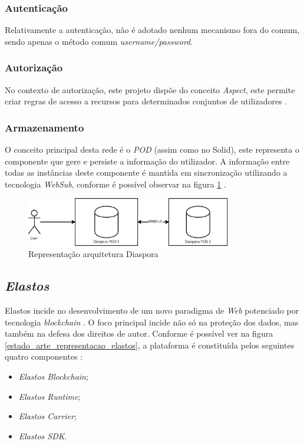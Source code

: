 \subsubsection{Autenticação}
Relativamente a autenticação, não é adotado nenhum mecanismo fora do comum, sendo apenas o método comum \emph{username/password}.

\subsubsection{Autorização}
No contexto de autorização, este projeto dispõe do conceito \emph{Aspect}, este permite criar regras de acesso a recursos para determinados conjuntos de utilizadores \cite{diaspora_wiki}.

\subsubsection{Armazenamento}
O conceito principal desta rede é o \emph{\acrshort{POD}} (assim como no Solid), este representa o componente que gere e persiste a informação do utilizador. A informação entre todas as instâncias deste componente é mantida em sincronização utilizando a tecnologia \emph{WebSub}, conforme é possível observar na figura \ref{estado_arte_representacao_diaspora} \cite{diaspora_wiki}.

\begin{figure}[H]
    \begin{center}
        \includegraphics[width=0.8\textwidth]{figures/estado_arte-Diaspora.eps}
        \caption{Representação arquitetura Diaspora}
        \label{estado_arte_representacao_diaspora}
    \end{center}
\end{figure}

\subsection{\emph{Elastos}}
Elastos incide no desenvolvimento de um novo paradigma de \emph{Web} potenciado por tecnologia \emph{blockchain} \cite{a_bit_about_blockchain}. O foco principal incide não só na proteção dos dados, mas também na defesa dos direitos de autor. Conforme é possível ver na figura \ref{estado_arte_representacao_elastos}, a plataforma é constituída pelos seguintes quatro componentes \cite{elastos_white_paper}:
\begin{itemize}
	\item \emph{Elastos Blockchain};
	\item \emph{Elastos Runtime};
	\item \emph{Elastos Carrier};
	\item \emph{Elastos SDK}.
\end{itemize}

